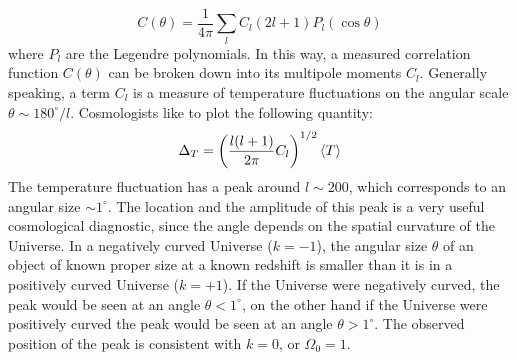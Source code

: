 \documentclass[10.75pt,a4paper,openright,bottom=2cm]{article}
\begin{document}
\[
C(\theta)=\frac{1}{4\pi}\sum_lC_l(2l+1)P_l(\cos\theta)
\]
where $P_l$ are the Legendre polynomials. In this way, a measured correlation function $C(\theta)$ can be broken down into its multipole moments $C_l$. Generally speaking, a term $C_l$ is
a measure of temperature fluctuations on the angular scale $\theta\sim180^\circ/l$. Cosmologists like to plot the following quantity:
\[
\Delta_T=\left(\frac{l(l+1)}{2\pi}C_l\right)^{1/2}\Braket{T}
\]
The temperature fluctuation has a peak around $l\sim200$, which corresponds to an angular size $\sim1^\circ$. The location and the amplitude of this peak is a very useful cosmological diagnostic, since the angle depends on the spatial curvature of the Universe. In a negatively curved Universe ($k=-1$), the angular size $\theta$ of an object of known proper size at a known redshift is smaller than it is in a positively curved Universe ($k=+1$). If the Universe were negatively curved, the peak would be seen at an angle $\theta<1^\circ$, on the other hand if the Universe were positively curved the peak would be seen at an angle $\theta>1^\circ$. The observed position of the peak is consistent with $k=0$, or $\Omega_0=1$.
\newpage
\end{document}
